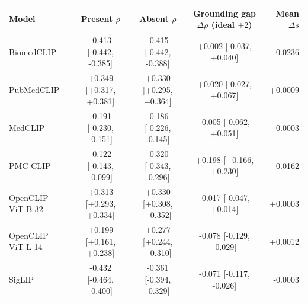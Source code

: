 \begin{tabular}{lcccr}
\toprule
Model & Present $\rho$ & Absent $\rho$ & Grounding gap $\Delta\rho$ (ideal $+2$) & Mean $\Delta s$ \\
\midrule
BiomedCLIP & -0.413 [-0.442, -0.385] & -0.415 [-0.442, -0.388] & +0.002 [-0.037, +0.040] & -0.0236 \\
PubMedCLIP & +0.349 [+0.317, +0.381] & +0.330 [+0.295, +0.364] & +0.020 [-0.027, +0.067] & +0.0009 \\
MedCLIP & -0.191 [-0.230, -0.151] & -0.186 [-0.226, -0.145] & -0.005 [-0.062, +0.051] & -0.0003 \\
PMC-CLIP & -0.122 [-0.143, -0.099] & -0.320 [-0.343, -0.296] & +0.198 [+0.166, +0.230] & -0.0162 \\
OpenCLIP ViT-B-32 & +0.313 [+0.293, +0.334] & +0.330 [+0.308, +0.352] & -0.017 [-0.047, +0.014] & +0.0003 \\
OpenCLIP ViT-L-14 & +0.199 [+0.161, +0.238] & +0.277 [+0.244, +0.310] & -0.078 [-0.129, -0.029] & +0.0012 \\
SigLIP & -0.432 [-0.464, -0.400] & -0.361 [-0.394, -0.329] & -0.071 [-0.117, -0.026] & -0.0003 \\
\bottomrule
\end{tabular}

